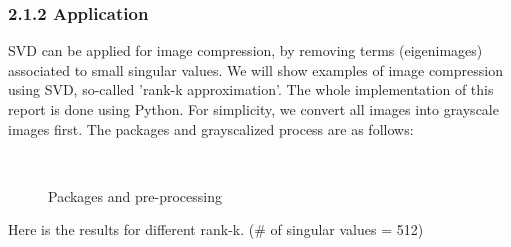 \documentclass[12pt]{article}
\begin{document}
\subsubsection*{2.1.2 \quad Application}
SVD can be applied for image compression, by removing terms (eigenimages) associated to small singular values.
We will show examples of image compression using SVD, so-called 'rank-k approximation'. The whole implementation of 
this report is done using Python. For simplicity, we convert all images into grayscale images first. The packages and 
grayscalized process are as follows:
\begin{figure}[H]
    \centering
    \\
    \caption{Packages and pre-processing}
\end{figure}
\begin{flushleft}
    Here is the results for different rank-k. (\# of singular values = 512)  
\end{flushleft}
\end{document}
